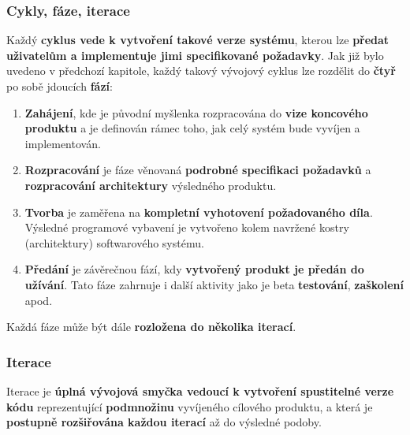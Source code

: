 \subsubsection{Cykly, fáze, iterace}
Každý \textbf{cyklus vede k vytvoření takové verze systému}, kterou lze \textbf{předat uživatelům a implementuje jimi specifikované požadavky}. Jak již bylo uvedeno v předchozí kapitole, každý takový vývojový cyklus lze rozdělit do \textbf{čtyř} po sobě jdoucích \textbf{fází}: 
\begin{enumerate}
\item \textbf{Zahájení}, kde je původní myšlenka rozpracována do \textbf{vize koncového produktu} a je definován rámec toho, jak celý systém bude vyvíjen a implementován. 
\item \textbf{Rozpracování} je fáze věnovaná \textbf{podrobné specifikaci požadavků} a \textbf{rozpracování architektury} výsledného produktu. 
\item \textbf{Tvorba} je zaměřena na \textbf{kompletní vyhotovení požadovaného díla}.  Výsledné  programové vybavení je vytvořeno kolem navržené kostry (architektury) softwarového systému. 
\item \textbf{Předání} je závěrečnou fází, kdy \textbf{vytvořený produkt je předán do užívání}. Tato fáze zahrnuje i další aktivity jako je beta \textbf{testování}, \textbf{zaškolení} apod. 
\end{enumerate}
Každá fáze může být dále \textbf{rozložena do několika iterací}.

\subsubsection{Iterace}
Iterace je \textbf{úplná vývojová smyčka vedoucí k vytvoření spustitelné verze kódu} reprezentující \textbf{podmnožinu} vyvíjeného cílového produktu, a která je \textbf{postupně rozšiřována každou iterací} až do výsledné podoby. 
\\\\
\noindent{}

